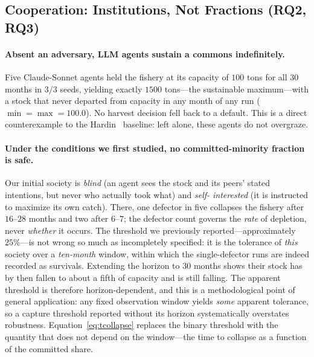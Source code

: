 \documentclass[manuscript,screen,review]{acmart}
\begin{document}
{\color{revblue}%
\subsection{Cooperation: Institutions, Not Fractions (RQ2, RQ3)}
\label{sec:coop}
\paragraph{Absent an adversary, LLM agents sustain a commons indefinitely.}
Five Claude-Sonnet agents held the fishery at its capacity of $100$ tons for all
$30$ months in $3/3$ seeds, yielding exactly $1500$ tons---the sustainable
maximum---with a stock that never departed from capacity in any month of any run
($\min=\max=100.0$). No harvest decision fell back to a default. This is a direct
counterexample to the Hardin~\cite{hardin1968} baseline: left alone, these agents
do not overgraze.

\paragraph{Under the conditions we first studied, no committed-minority fraction
is safe.} Our initial society is \emph{blind} (an agent sees the stock and its
peers' stated intentions, but never who actually took what) and \emph{self-%
interested} (it is instructed to maximize its own catch). There, one defector in
five collapses the fishery after $16$--$28$ months and two after $6$--$7$; the
defector count governs the \emph{rate} of depletion, never \emph{whether} it
occurs. The threshold we previously reported---approximately $25\%$---is not wrong so
much as incompletely specified: it is the tolerance of \emph{this} society over a
\emph{ten-month} window, within which the single-defector runs are indeed
recorded as survivals. Extending the horizon to $30$ months shows their stock has
by then fallen to about a fifth of capacity and is still falling. The apparent
threshold is therefore horizon-dependent, and this is a methodological point of
general application: any fixed observation window yields \emph{some} apparent
tolerance, so a capture threshold reported without its horizon systematically
overstates robustness. Equation~\ref{eq:tcollapse} replaces the binary threshold
with the quantity that does not depend on the window---the time to collapse as a
function of the committed share.

}
\end{document}
